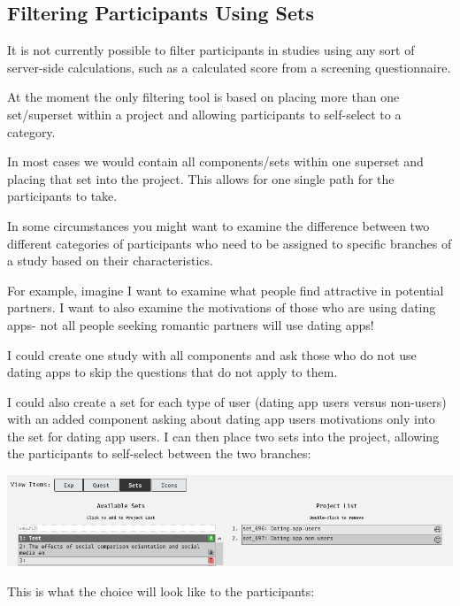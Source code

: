 \documentclass[]{book}
\begin{document}
\hypertarget{filtering}{\subsection*{Filtering Participants Using
Sets}\label{filtering}}

\begin{info}
It is not currently possible to filter participants in studies using any
sort of server-side calculations, such as a calculated score from a
screening questionnaire.
\end{info}

At the moment the only filtering tool is based on placing more than one
set/superset within a project and allowing participants to self-select
to a category.

In most cases we would contain all components/sets within one superset
and placing that set into the project. This allows for one single path
for the participants to take.

In some circumstances you might want to examine the difference between
two different categories of participants who need to be assigned to
specific branches of a study based on their characteristics.

For example, imagine I want to examine what people find attractive in
potential partners. I want to also examine the motivations of those who
are using dating apps- not all people seeking romantic partners will use
dating apps!

I could create one study with all components and ask those who do not
use dating apps to skip the questions that do not apply to them.

I could also create a set for each type of user (dating app users versus
non-users) with an added component asking about dating app users
motivations only into the set for dating app users. I can then place two
sets into the project, allowing the participants to self-select between
the two branches:

\includegraphics{images/screenshots/proj_13.png}

This is what the choice will look like to the participants:
\end{document}

